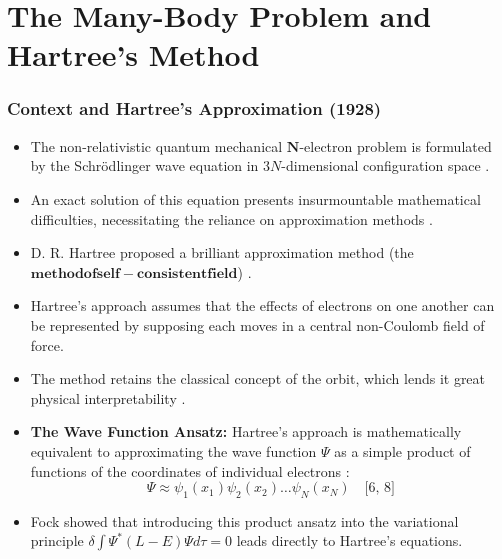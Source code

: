 \section{The Many-Body Problem and Hartree's Method}
\begin{frame}
    \frametitle{Context and Hartree's Approximation (1928)}
    \begin{itemize}
        \item The non-relativistic quantum mechanical $\mathbf{N}$-electron problem is formulated by the Schrödlinger wave equation in $3N$-dimensional configuration space .
        \item An exact solution of this equation presents insurmountable mathematical difficulties, necessitating the reliance on approximation methods .
        \item D. R. Hartree proposed a brilliant approximation method (the $\mathbf{method of self-consistent field}$) .
        \item Hartree's approach assumes that the effects of electrons on one another can be represented by supposing each moves in a central non-Coulomb field of force.
        \item The method retains the classical concept of the orbit, which lends it great physical interpretability .
        \item \textbf{The Wave Function Ansatz:} Hartree's approach is mathematically equivalent to approximating the wave function $\Psi$ as a simple product of functions of the coordinates of individual electrons :
        $$\Psi \approx \psi_1(x_1)\psi_2(x_2) \dots \psi_N(x_N) \quad \text{[6, 8]}$$
        \item Fock showed that introducing this product ansatz into the variational principle $\delta \int \Psi^* (L - E) \Psi d\tau = 0$ leads directly to Hartree's equations.
    \end{itemize}
\end{frame}

